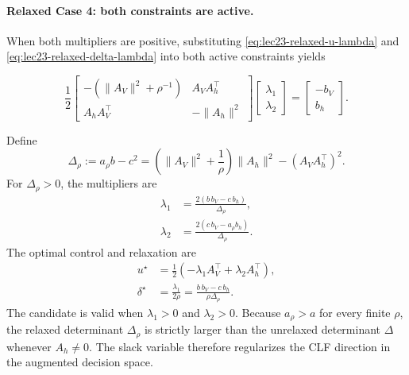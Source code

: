 \documentclass[../../master-handout.tex]{subfiles}
\begin{document}
\paragraph{Relaxed Case 4: both constraints are active.}

When both multipliers are positive, substituting \eqref{eq:lec23-relaxed-u-lambda} and \eqref{eq:lec23-relaxed-delta-lambda} into both active constraints yields
\begin{fullwidth}
\begin{equation}
    \frac{1}{2}
    \begin{bmatrix}
        -\left(\|A_V\|^2+\rho^{-1}\right)
        &
        A_VA_h^\top
        \\
        A_hA_V^\top
        &
        -\|A_h\|^2
    \end{bmatrix}
    \begin{bmatrix}
        \lambda_1
        \\
        \lambda_2
    \end{bmatrix}
    =
    \begin{bmatrix}
        -b_V
        \\
        b_h
    \end{bmatrix}.
    \label{eq:lec23-relaxed-case4-system}
\end{equation}
\end{fullwidth}
Define
\begin{equation}
    \Delta_\rho
    :=
    a_\rho b-c^2
    =
    \left(
        \|A_V\|^2+\frac{1}{\rho}
    \right)
    \|A_h\|^2
    -
    \left(A_VA_h^\top\right)^2.
    \label{eq:lec23-delta-rho}
\end{equation}
For $\Delta_\rho>0$, the multipliers are
\begin{align}
    \lambda_1
    &=
    \frac{
        2\left(
            b\,b_V-c\,b_h
        \right)
    }{
        \Delta_\rho
    },
    \label{eq:lec23-relaxed-case4-lambda1}
    \\
    \lambda_2
    &=
    \frac{
        2\left(
            c\,b_V-a_\rho b_h
        \right)
    }{
        \Delta_\rho
    }.
    \label{eq:lec23-relaxed-case4-lambda2}
\end{align}
The optimal control and relaxation are
\begin{align}
    u^\star
    &=
    \frac{1}{2}
    \left(
        -\lambda_1A_V^\top
        +
        \lambda_2A_h^\top
    \right),
    \label{eq:lec23-relaxed-case4-u}
    \\
    \delta^\star
    &=
    \frac{\lambda_1}{2\rho}
    =
    \frac{
        b\,b_V-c\,b_h
    }{
        \rho\Delta_\rho
    }.
    \label{eq:lec23-relaxed-case4-delta}
\end{align}
The candidate is valid when $\lambda_1>0$ and $\lambda_2>0$. Because $a_\rho>a$ for every finite $\rho$, the relaxed determinant $\Delta_\rho$ is strictly larger than the unrelaxed determinant $\Delta$ whenever $A_h\neq 0$. The slack variable therefore regularizes the CLF direction in the augmented decision space.
\end{document}
